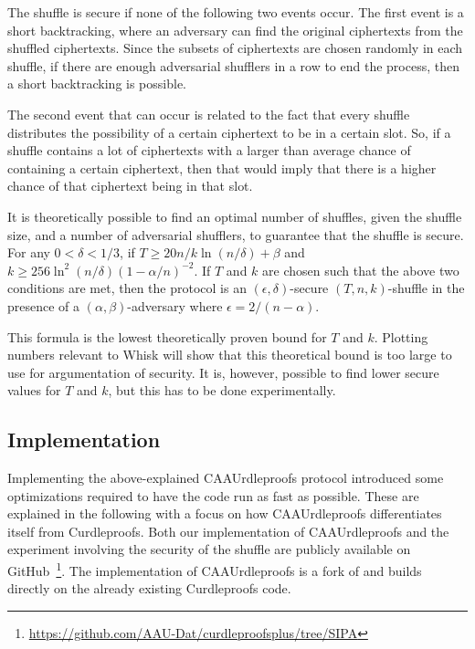 The shuffle is secure if none of the following two events occur.
The first event is a short backtracking, where an adversary can find the original ciphertexts from the shuffled ciphertexts.
Since the subsets of ciphertexts are chosen randomly in each shuffle, if there are enough adversarial shufflers in a row to end the process, then a short backtracking is possible.

The second event that can occur is related to the fact that every shuffle distributes the possibility of a certain ciphertext to be in a certain slot.
So, if a shuffle contains a lot of ciphertexts with a larger than average chance of containing a certain ciphertext, then that would imply that there is a higher chance of that ciphertext being in that slot.

It is theoretically possible to find an optimal number of shuffles, given the shuffle size, and a number of adversarial shufflers, to guarantee that the shuffle is secure.
For any $0 < \delta < 1/3$, if $T \geq 20 n / k \ln(n/\delta) + \beta $ and $ k \geq 256 \ln^2(n/\delta)(1 - \alpha/n)^{-2}$.
If $T$ and $k$ are chosen such that the above two conditions are met, then the protocol is an $(\epsilon , \delta)$-secure $(T,n,k)$-shuffle in the presence of a $(\alpha, \beta)$-adversary where $\epsilon = 2/(n-\alpha)$.

This formula is the lowest theoretically proven bound for $T$ and $k$.
Plotting numbers relevant to Whisk will show that this theoretical bound is too large to use for argumentation of security.
It is, however, possible to find lower secure values for $T$ and $k$, but this has to be done experimentally.


\subsection{Implementation}\label{subsec:approach-implementation}
Implementing the above-explained CAAUrdleproofs protocol introduced some optimizations required to have the code run as fast as possible.
These are explained in the following with a focus on how CAAUrdleproofs differentiates itself from Curdleproofs.
Both our implementation of CAAUrdleproofs and the experiment involving the security of the shuffle are publicly available on GitHub~\footnote{\href{https://github.com/AAU-Dat/curdleproofsplus/tree/SIPA}{https://github.com/AAU-Dat/curdleproofsplus/tree/SIPA}}.
The implementation of CAAUrdleproofs is a fork of and builds directly on the already existing Curdleproofs code.
